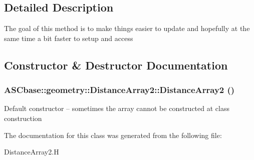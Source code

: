 \subsection{Detailed Description}
The goal of this method is to make things easier to update and hopefully at the same time a bit faster to setup and access 



\subsection{Constructor \& Destructor Documentation}
\subsubsection{\setlength{\rightskip}{0pt plus 5cm}ASCbase::geometry::Distance\-Array2::Distance\-Array2 ()\hspace{0.3cm}{\tt  [inline]}}\label{classASCbase_1_1geometry_1_1DistanceArray2_e951f6ba30f7b4868e4b00347f24da0e}


Default constructor -- sometimes the array cannot be constructed at class construction 

The documentation for this class was generated from the following file:\begin{CompactItemize}
\item 
Distance\-Array2.H\end{CompactItemize}
